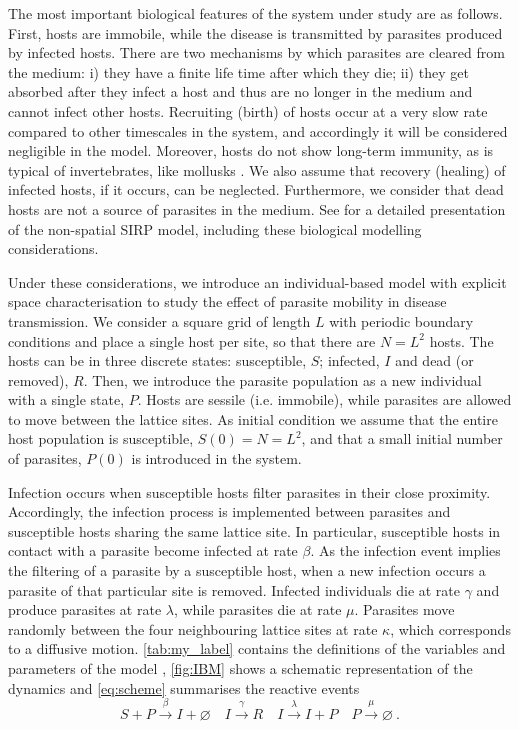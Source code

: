 The most important biological features of the system under study are as
follows. First, hosts are immobile, while the disease is transmitted by
parasites produced by infected hosts. There are two mechanisms by which
parasites are cleared from the medium: i) they have a finite life time after
which they die; ii) they get absorbed after they infect a host and thus are no
longer in the medium and cannot infect other hosts. Recruiting (birth) of hosts
occur at a very slow rate compared to other timescales in the system, and
accordingly it will be considered negligible in the model. Moreover, hosts do
not show long-term immunity, as is typical of invertebrates, like mollusks
\cite{Powell2015}. We also assume that recovery (healing) of infected hosts, if
it occurs, can be neglected. Furthermore, we consider that dead hosts are not a
source of parasites in the medium. See \cite{GimenezRomero2021} for a detailed
presentation of the non-spatial SIRP model, including these biological
modelling considerations.

Under these considerations, we introduce an individual-based model with
explicit space characterisation to study the effect of parasite mobility in
disease transmission. We consider a square grid of length $L$ with periodic
boundary conditions and place a single host per site, so that there are $N=L^2$
hosts. The hosts can be in three discrete states: susceptible, $S$; infected,
$I$ and dead (or removed), $R$. Then, we introduce the parasite population as a
new individual with a single state, $P$. Hosts are sessile (i.e. immobile),
while parasites are allowed to move between the lattice sites. As initial
condition we assume that the entire host population is susceptible,
$S(0)=N=L^2$, and that a small initial number of parasites, $P(0)$ is
introduced in the system.

Infection occurs when susceptible hosts filter parasites in their close
proximity. Accordingly, the infection process is implemented between parasites
and susceptible hosts sharing the same lattice site. In particular, susceptible
hosts in contact with a parasite become infected at rate $\beta$. As the
infection event implies the filtering of a parasite by a susceptible host, when
a new infection occurs a parasite of that particular site is removed. Infected
individuals die at rate $\gamma$ and produce parasites at rate $\lambda$, while
parasites die at rate $\mu$. Parasites move randomly between the four
neighbouring lattice sites at rate $\kappa$, which corresponds to a diffusive
motion. \cref{tab:my_label} contains the definitions of the variables and
parameters of the model , \cref{fig:IBM} shows a schematic representation of
the dynamics and \cref{eq:scheme} summarises the reactive events
\begin{equation}\label{eq:scheme}
    S+P \stackrel{\beta}{\rightarrow} I + \varnothing \quad I
    \stackrel{\gamma}{\rightarrow} R \quad I \stackrel{\lambda}{\rightarrow}
    I+P
    \quad P \stackrel{\mu}{\rightarrow} \varnothing \ .
\end{equation}

